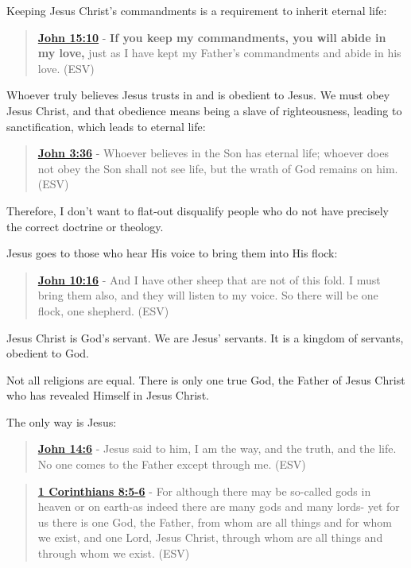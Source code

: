 \documentclass[11pt]{article}
\begin{document}
Keeping Jesus Christ's commandments is a requirement to inherit eternal life:

\begin{quote}
\textbf{\href{https://www.biblegateway.com/passage/?search=John\%2015\%3A10\&version=ESV}{John 15:10}} - \textbf{If you keep my commandments, you will abide in my love,} just as I have kept my Father's commandments and abide in his love. (ESV)
\end{quote}

Whoever truly believes Jesus trusts in and is obedient to Jesus. We must obey Jesus Christ, and that obedience means being a slave of righteousness, leading to sanctification, which leads to eternal life:

\begin{quote}
\textbf{\href{https://www.biblegateway.com/passage/?search=John\%203\%3A36\&version=ESV}{John 3:36}} - Whoever believes in the Son has eternal life; whoever does not obey the Son shall not see life, but the wrath of God remains on him. (ESV)
\end{quote}

Therefore, I don't want to flat-out disqualify people who do not have precisely the correct doctrine or theology.

Jesus goes to those who hear His voice to bring them into His flock:

\begin{quote}
\textbf{\href{https://www.biblegateway.com/passage/?search=John\%2010\%3A16\&version=ESV}{John 10:16}} - And I have other sheep that are not of this fold. I must bring them also, and they will listen to my voice. So there will be one flock, one shepherd. (ESV)
\end{quote}

Jesus Christ is God's servant. We are Jesus' servants. It is a kingdom of servants, obedient to God.

Not all religions are equal. There is only one true God, the Father of Jesus Christ who has revealed Himself in Jesus Christ.

The only way is Jesus:

\begin{quote}
\textbf{\href{https://www.biblegateway.com/passage/?search=John\%2014\%3A6\&version=ESV}{John 14:6}} - Jesus said to him, I am the way, and the truth, and the life. No one comes to the Father except through me. (ESV)
\end{quote}

\begin{quote}
\textbf{\href{https://www.biblegateway.com/passage/?search=1\%20Corinthians\%208\%3A5-6\&version=ESV}{1 Corinthians 8:5-6}} - For although there may be so-called gods in heaven or on earth-as indeed there are many gods and many lords- yet for us there is one God, the Father, from whom are all things and for whom we exist, and one Lord, Jesus Christ, through whom are all things and through whom we exist. (ESV)
\end{quote}
\end{document}
